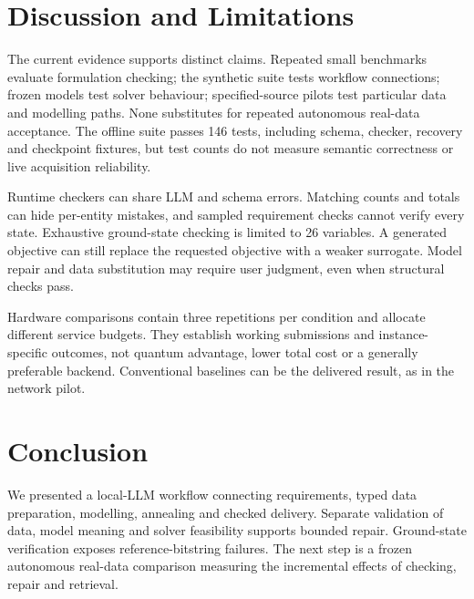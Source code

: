 \section{Discussion and Limitations}
The current evidence supports distinct claims. Repeated small benchmarks evaluate formulation checking;
the synthetic suite tests workflow connections; frozen models test solver behaviour; specified-source pilots
test particular data and modelling paths. None substitutes for repeated autonomous real-data acceptance.
The offline suite passes 146 tests, including schema, checker, recovery and checkpoint fixtures, but test counts
do not measure semantic correctness or live acquisition reliability.

Runtime checkers can share LLM and schema errors. Matching counts and totals can hide per-entity mistakes,
and sampled requirement checks cannot verify every state. Exhaustive ground-state checking is limited to 26
variables. A generated objective can still replace the requested objective with a weaker surrogate.
Model repair and data substitution may require user judgment, even when structural checks pass.

Hardware comparisons contain three repetitions per condition and allocate different service budgets.
They establish working submissions and instance-specific outcomes, not quantum advantage, lower total cost or
a generally preferable backend. Conventional baselines can be the delivered result, as in the network pilot.

\section{Conclusion}
We presented a local-LLM workflow connecting requirements, typed data preparation, modelling, annealing and
checked delivery. Separate validation of data, model meaning and solver feasibility supports bounded repair.
Ground-state verification exposes reference-bitstring failures. The next step is a frozen autonomous real-data
comparison measuring the incremental effects of checking, repair and retrieval.
